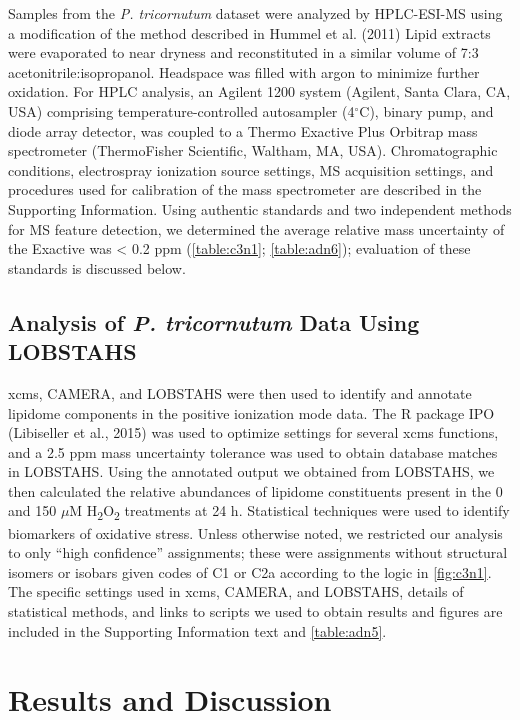 Samples from the \emph{P. tricornutum} dataset were analyzed by HPLC-ESI-MS using a modification of the method described in Hummel et al. (2011) Lipid extracts were evaporated to near dryness and reconstituted in a similar volume of 7:3 acetonitrile:isopropanol. Headspace was filled with argon to minimize further oxidation. For HPLC analysis, an Agilent 1200 system (Agilent, Santa Clara, CA, USA) comprising temperature-controlled autosampler (4$^{\circ}$C), binary pump, and diode array detector, was coupled to a Thermo Exactive Plus Orbitrap mass spectrometer (ThermoFisher Scientific, Waltham, MA, USA). Chromatographic conditions, electrospray ionization source settings, MS acquisition settings, and procedures used for calibration of the mass spectrometer are described in the Supporting Information. Using authentic standards and two independent methods for MS feature detection, we determined the average relative mass uncertainty of the Exactive was \textless{} 0.2 ppm (\autoref{table:c3n1}; \autoref{table:adn6}); evaluation of these standards is discussed below.

\subsection{Analysis of \emph{P. tricornutum} Data Using LOBSTAHS}

xcms, CAMERA, and LOBSTAHS were then used to identify and annotate lipidome components in the positive ionization mode data. The R package IPO (Libiseller et al., 2015) was used to optimize settings for several xcms functions, and a 2.5 ppm mass uncertainty tolerance was used to obtain database matches in LOBSTAHS. Using the annotated output we obtained from LOBSTAHS, we then calculated the relative abundances of lipidome constituents present in the 0 and 150 $\mu$M H\textsubscript{2}O\textsubscript{2} treatments at 24 h. Statistical techniques were used to identify biomarkers of oxidative stress. Unless otherwise noted, we restricted our analysis to only ``high confidence'' assignments; these were assignments without structural isomers or isobars given codes of C1 or C2a according to the logic in \autoref{fig:c3n1}. The specific settings used in xcms, CAMERA, and LOBSTAHS, details of statistical methods, and links to scripts we used to obtain results and figures are included in the Supporting Information text and \autoref{table:adn5}.

\section{Results and Discussion}

